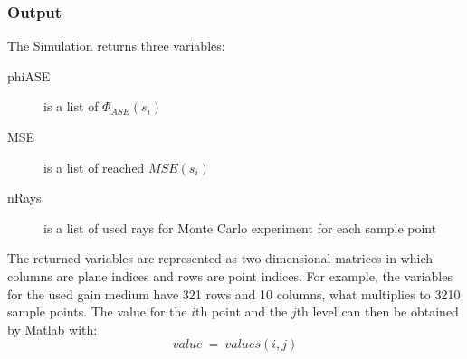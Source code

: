 \subsubsection{Output}
The Simulation returns three variables:
\begin{description}
  \item[phiASE] is a list of $\Phi_{ASE}(s_i)$ 
  \item[MSE] is a list of reached $MSE(s_i)$
  \item[nRays] is a list of used rays for Monte Carlo experiment for each sample point
    
\end{description}
The returned variables are represented as two-dimensional matrices in 
which columns are plane indices and rows are point indices.
For example, the variables for the used gain
medium have 321 rows and 10 columns, what multiplies to
3210 sample points. The value for the $i$th point and
the $j$th level can then be obtained by Matlab with:
\[value~=~values(i,j)\]
